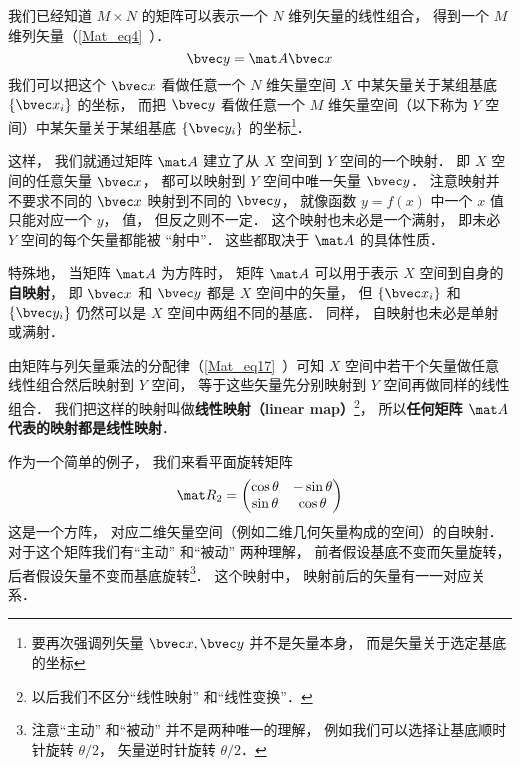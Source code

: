 


我们已经知道 $M\times N$ 的矩阵可以表示一个 $N$ 维列矢量的线性组合， 得到一个 $M$ 维列矢量（\autoref{Mat_eq4}~）．
\begin{equation}\label{MatLS_eq1}
\bvec y = \mat A \bvec x
\end{equation}
我们可以把这个 $\bvec x$ 看做任意一个 $N$ 维矢量空间 $X$ 中某矢量关于某组基底 $\{\bvec x_i\}$ 的坐标， 而把 $\bvec y$ 看做任意一个 $M$ 维矢量空间（以下称为 $Y$ 空间）中某矢量关于某组基底 $\{\bvec y_i\}$ 的坐标\footnote{要再次强调列矢量 $\bvec x, \bvec y$ 并不是矢量本身， 而是矢量关于选定基底的坐标}．

这样， 我们就通过矩阵 $\mat A$ 建立了从 $X$ 空间到 $Y$ 空间的一个映射． 即 $X$ 空间的任意矢量 $\bvec x$， 都可以映射到 $Y$ 空间中唯一矢量 $\bvec y$． 注意映射并不要求不同的 $\bvec x$ 映射到不同的 $\bvec y$， 就像函数 $y = f(x)$ 中一个 $x$ 值只能对应一个 $y$， 值， 但反之则不一定． 这个映射也未必是一个满射， 即未必 $Y$ 空间的每个矢量都能被 “射中”． 这些都取决于 $\mat A$ 的具体性质．

特殊地， 当矩阵 $\mat A$ 为方阵时， 矩阵 $\mat A$ 可以用于表示 $X$ 空间到自身的\textbf{自映射}， 即 $\bvec x$ 和 $\bvec y$ 都是 $X$ 空间中的矢量， 但 $\{\bvec x_i\}$ 和 $\{\bvec y_i\}$ 仍然可以是 $X$ 空间中两组不同的基底． 同样， 自映射也未必是单射或满射．

由矩阵与列矢量乘法的分配律（\autoref{Mat_eq17}~）可知 $X$ 空间中若干个矢量做任意线性组合然后映射到 $Y$ 空间， 等于这些矢量先分别映射到 $Y$ 空间再做同样的线性组合． 我们把这样的映射叫做\textbf{线性映射（linear map）}\footnote{以后我们不区分“线性映射” 和“线性变换”．}， 所以\textbf{任何矩阵 $\mat A$ 代表的映射都是线性映射}．

作为一个简单的例子， 我们来看平面旋转矩阵
\begin{equation}
\mat R_2 = \begin{pmatrix}
\cos\theta & - \sin\theta\\
\sin\theta &\cos\theta
\end{pmatrix}
\end{equation}
这是一个方阵， 对应二维矢量空间（例如二维几何矢量构成的空间）的自映射． 对于这个矩阵我们有“主动” 和“被动” 两种理解， 前者假设基底不变而矢量旋转， 后者假设矢量不变而基底旋转\footnote{注意“主动” 和“被动” 并不是两种唯一的理解， 例如我们可以选择让基底顺时针旋转 $\theta/2$， 矢量逆时针旋转 $\theta/2$．}． 这个映射中， 映射前后的矢量有一一对应关系．

